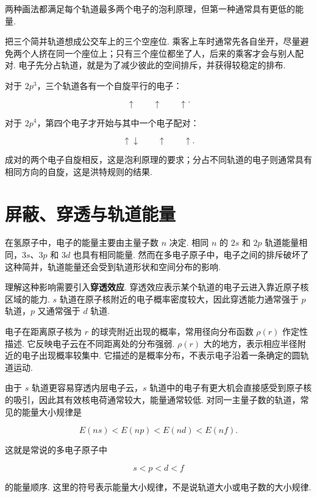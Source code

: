 \documentclass[UTF8,11pt,a4paper,openany]{ctexbook}
\newcommand{\term}[1]{\textbf{#1}}
\begin{document}
两种画法都满足每个轨道最多两个电子的泡利原理，但第一种通常具有更低的能量. 

\begin{analogybox}
把三个简并轨道想成公交车上的三个空座位. 乘客上车时通常先各自坐开，尽量避免两个人挤在同一个座位上；只有三个座位都坐了人，后来的乘客才会与别人配对. 电子先分占轨道，就是为了减少彼此的空间排斥，并获得较稳定的排布. 
\end{analogybox}

对于 $2p^3$，三个轨道各有一个自旋平行的电子：

\[
\boxed{\uparrow}\qquad
\boxed{\uparrow}\qquad
\boxed{\uparrow}.
\]

对于 $2p^4$，第四个电子才开始与其中一个电子配对：

\[
\boxed{\uparrow\downarrow}\qquad
\boxed{\uparrow}\qquad
\boxed{\uparrow}.
\]

成对的两个电子自旋相反，这是泡利原理的要求；分占不同轨道的电子则通常具有相同方向的自旋，这是洪特规则的结果. 

\section{屏蔽、穿透与轨道能量}

在氢原子中，电子的能量主要由主量子数 $n$ 决定. 相同 $n$ 的 $2s$ 和 $2p$ 轨道能量相同，$3s$、$3p$ 和 $3d$ 也具有相同能量. 然而在多电子原子中，电子之间的排斥破坏了这种简并，轨道能量还会受到轨道形状和空间分布的影响. 

理解这种影响需要引入\term{穿透效应}. 穿透效应表示某个轨道的电子云进入靠近原子核区域的能力. $s$ 轨道在原子核附近的电子概率密度较大，因此穿透能力通常强于 $p$ 轨道，$p$ 又通常强于 $d$ 轨道. 

\begin{notationbox}
电子在距离原子核为 $r$ 的球壳附近出现的概率，常用径向分布函数 $\rho(r)$ 作定性描述. 它反映电子云在不同距离处的分布强弱. $\rho(r)$ 大的地方，表示相应半径附近的电子出现概率较集中. 它描述的是概率分布，不表示电子沿着一条确定的圆轨道运动. 
\end{notationbox}

由于 $s$ 轨道更容易穿透内层电子云，$s$ 轨道中的电子有更大机会直接感受到原子核的吸引，因此其有效核电荷通常较大，能量通常较低. 对同一主量子数的轨道，常见的能量大小规律是

\[
E(ns)<E(np)<E(nd)<E(nf).
\]

这就是常说的多电子原子中

\[
s<p<d<f
\]

的能量顺序. 这里的符号表示能量大小规律，不是说轨道大小或电子数的大小规律. 
\end{document}
